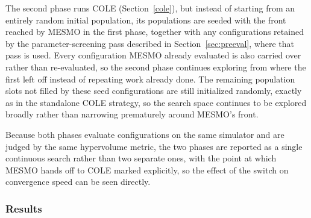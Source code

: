 \documentclass[12pt,a4paper,faculty=ea,language=en]{ugent-doc}
\begin{document}
The second phase runs COLE (Section~\ref{cole}), but instead of starting from an entirely random initial population, its populations are seeded with the front reached by MESMO in the first phase, together with any configurations retained by the parameter-screening pass described in Section~\ref{sec:preeval}, where that pass is used. Every configuration MESMO already evaluated is also carried over rather than re-evaluated, so the second phase continues exploring from where the first left off instead of repeating work already done. The remaining population slots not filled by these seed configurations are still initialized randomly, exactly as in the standalone COLE strategy, so the search space continues to be explored broadly rather than narrowing prematurely around MESMO's front.

Because both phases evaluate configurations on the same simulator and are judged by the same hypervolume metric, the two phases are reported as a single continuous search rather than two separate ones, with the point at which MESMO hands off to COLE marked explicitly, so the effect of the switch on convergence speed can be seen directly.
\subsubsection{Results}
\end{document}
